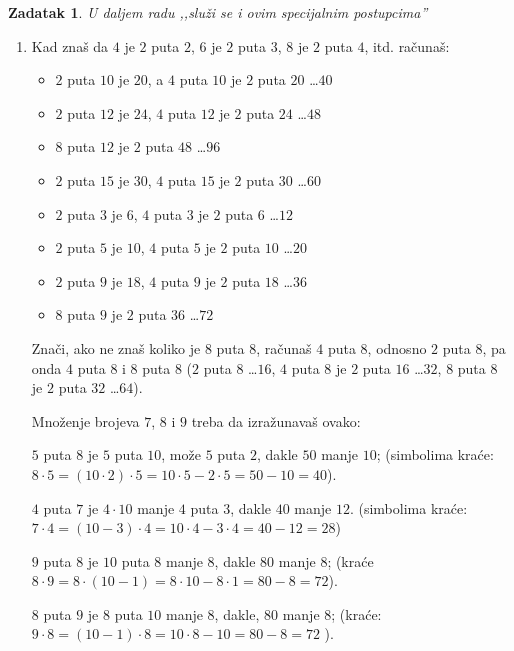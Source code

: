 \documentclass[a4paper,12pt]{book}
\newtheorem{zad}{Zadatak}
\begin{document}
    \begin{zad}
    U daljem radu ,,slu\v zi se i ovim specijalnim postupcima'' %
    \end{zad}
    \begin{enumerate}
        \item Kad zna\v s da $4$ je $2$ puta $2$, $6$ je $2$ puta $3$, $8$ je $2$ puta $4$, itd. ra\v cuna\v s:
        \begin{itemize}
            \item $2$ puta $10$ je $20$, a $4$ puta $10$ je $2$ puta $20$ \dots $40$
            \item $2$ puta $12$ je $24$, $4$ puta $12$ je $2$ puta $24$ \dots $48$
            \item $8$ puta $12$ je $2$ puta $48$ \dots $96$
            \item $2$ puta $15$ je $30$, $4$ puta $15$ je $2$ puta $30$ \dots $60$
            \item $2$ puta $3$ je $6$, $4$ puta $3$ je $2$ puta $6$ \dots $12$
            \item $2$ puta $5$ je $10$, $4$ puta $5$ je $2$ puta $10$ \dots $20$
            \item $2$ puta $9$ je $18$, $4$ puta $9$ je $2$ puta $18$ \dots $36$
            \item $8$ puta $9$ je $2$ puta $36$ \dots $72$
        \end{itemize}
        Zna\v ci, ako ne zna\v s koliko je $8$ puta $8$, ra\v cuna\v s $4$ puta $8$, odnosno $2$ puta $8$,
        pa onda $4$ puta $8$ i $8$ puta $8$ ($2$ puta $8$ \dots $16$, $4$ puta $8$ je $2$ puta $16$ \dots $32$,
        $8$ puta $8$ je $2$ puta $32$ \dots $64$).

        Mno\v zenje brojeva $7$, $8$ i $9$ treba da izra\v zunava\v s ovako:

        $5$ puta $8$ je $5$ puta $10$, mo\v ze $5$ puta $2$, dakle $50$ manje $10$;
        (simbolima kra\' ce: $8 \cdot 5 = (10 \cdot 2) \cdot 5 = 10 \cdot 5 - 2 \cdot 5 = 50 - 10 = 40$).

        $4$ puta $7$ je $4 \cdot 10$ manje $4$ puta $3$, dakle $40$ manje $12$.
        (simbolima kra\' ce: $7 \cdot 4 = (10 - 3) \cdot 4 = 10 \cdot 4 - 3 \cdot 4 = 40 - 12 = 28$)

        $9$ puta $8$ je $10$ puta $8$ manje $8$, dakle $80$ manje $8$;
        (kra\' ce $8 \cdot 9 = 8 \cdot (10 - 1) = 8 \cdot 10 - 8 \cdot 1 = 80 - 8 = 72$).

        $8$ puta $9$ je $8$ puta $10$ manje $8$, dakle, $80$ manje $8$;
        (kra\' ce: $9 \cdot 8 = (10 - 1) \cdot 8 = 10 \cdot 8 - 10 = 80 - 8 = 72$ ).


\end{enumerate}
\end{document}
